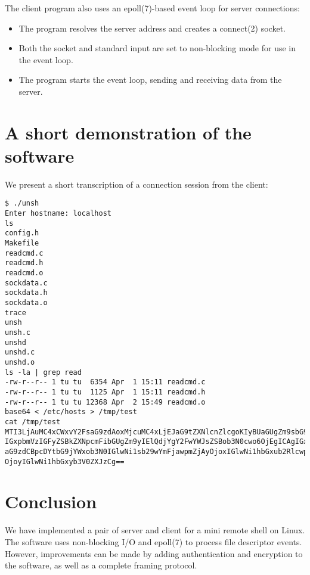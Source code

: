 \documentclass[12pt]{article}
\begin{document}
The client program also uses an epoll(7)-based event loop for server connections:

\begin{itemize}
\item The program resolves the server address and creates a connect(2) socket.
\item Both the socket and standard input are set to non-blocking mode for use in the event loop.
\item The program starts the event loop, sending and receiving data from the server.
\end{itemize}


\section{A short demonstration of the software}

We present a short transcription of a connection session from the client:

\begin{lstlisting}
$ ./unsh
Enter hostname: localhost
ls
config.h
Makefile
readcmd.c
readcmd.h
readcmd.o
sockdata.c
sockdata.h
sockdata.o
trace
unsh
unsh.c
unshd
unshd.c
unshd.o
ls -la | grep read
-rw-r--r-- 1 tu tu  6354 Apr  1 15:11 readcmd.c
-rw-r--r-- 1 tu tu  1125 Apr  1 15:11 readcmd.h
-rw-r--r-- 1 tu tu 12368 Apr  2 15:49 readcmd.o
base64 < /etc/hosts > /tmp/test
cat /tmp/test
MTI3LjAuMC4xCWxvY2FsaG9zdAoxMjcuMC4xLjEJaG9tZXNlcnZlcgoKIyBUaGUgZm9sbG93aW5n
IGxpbmVzIGFyZSBkZXNpcmFibGUgZm9yIElQdjYgY2FwYWJsZSBob3N0cwo6OjEgICAgIGxvY2Fs
aG9zdCBpcDYtbG9jYWxob3N0IGlwNi1sb29wYmFjawpmZjAyOjoxIGlwNi1hbGxub2RlcwpmZjAy
OjoyIGlwNi1hbGxyb3V0ZXJzCg==
\end{lstlisting}


\section{Conclusion}

We have implemented a pair of server and client for a mini remote shell on Linux. The software uses non-blocking I/O and epoll(7) to process file descriptor events. However, improvements can be made by adding authentication and encryption to the software, as well as a complete framing protocol.

\end{document}
